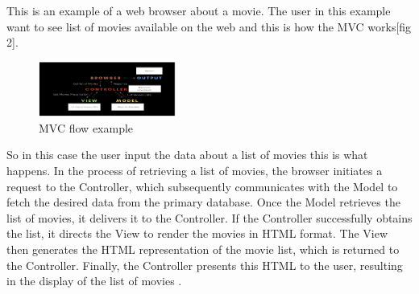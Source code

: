 \documentclass[conference]{IEEEtran}
\begin{document}
This is an example of a web browser about a movie. The user in this example want to see list of movies available on the web and this is how the MVC works[fig 2].

\begin{figure}
    [h]
    \centering
    \includegraphics[width = 0.4\textwidth]{Image/figure 2.PNG}
    \caption{MVC flow example \cite{rustagi2022mvc}}
    \label{fig:enter-label}
\end{figure}

So in this case the user input the data about a list of movies this is what happens. 
In the process of retrieving a list of movies, the browser initiates a request to the Controller, which subsequently communicates with the Model to fetch the desired data from the primary database. Once the Model retrieves the list of movies, it delivers it to the Controller. If the Controller successfully obtains the list, it directs the View to render the movies in HTML format. The View then generates the HTML representation of the movie list, which is returned to the Controller. Finally, the Controller presents this HTML to the user, resulting in the display of the list of movies \cite{rustagi2022mvc}.
\end{document}
